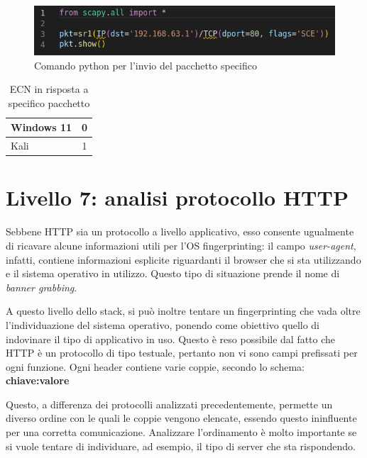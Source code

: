 \begin{figure}[]
	\includegraphics[width=\textwidth]{figures/congestione.png}
	\caption{Comando python per l'invio del pacchetto specifico}
	\label{congestione}
\end{figure}

\begin{table}[h]
	\centering
	\begin{tabular}{ l | c }
		\hline
		\rowcolor{blue!10} Windows 11 & 0
		\\
		\hline
		\rowcolor{red!10} Kali & 1
		\\
		\hline
		
	\end{tabular}
	\caption{ECN in risposta a specifico pacchetto}
	\label{tab:ECN}
\end{table}


\section{Livello 7: analisi protocollo HTTP}
Sebbene HTTP sia un protocollo a livello applicativo, esso consente ugualmente di ricavare alcune informazioni utili per l'OS fingerprinting: il campo \textit{user-agent}, infatti, contiene informazioni esplicite riguardanti il browser che si sta utilizzando e il sistema operativo in utilizzo. Questo tipo di situazione prende il nome di \textit{banner grabbing}.

A questo livello dello stack, si può inoltre tentare un fingerprinting che vada oltre l'individuazione del sistema operativo, ponendo come obiettivo quello di indovinare il tipo di applicativo in uso.
Questo è reso possibile dal fatto che HTTP è un protocollo di tipo testuale, pertanto non vi sono campi prefissati per ogni funzione. 
Ogni header contiene varie coppie, secondo lo schema:\\
\textbf{chiave:valore} 


Questo, a differenza dei protocolli analizzati precedentemente, permette un diverso ordine con le quali le coppie vengono elencate, essendo questo ininfluente per una corretta comunicazione. Analizzare l'ordinamento è molto importante se si vuole tentare di individuare, ad esempio, il tipo di server che sta rispondendo.






